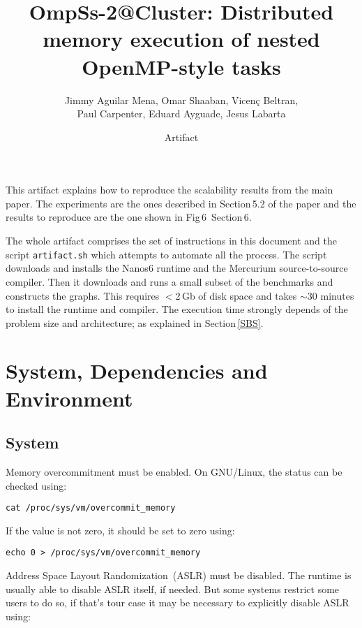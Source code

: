 \documentclass{article}
\newcommand{\code}[1]{\texttt{#1}}
\begin{document}
\title{OmpSs-2@Cluster: Distributed memory execution of nested OpenMP-style tasks}

\author{Jimmy Aguilar Mena, Omar Shaaban, Vicen\c{c} Beltran,\\
  Paul Carpenter, Eduard Ayguade, Jesus Labarta}
\date{Artifact}

\maketitle

This artifact explains how to reproduce the scalability results from
the main paper.  The experiments are the ones described in
Section\,5.2 of the paper and the results to reproduce are the one
shown in Fig\,6~Section\,6.

The whole artifact comprises the set of instructions in this document
and the script \code{artifact.sh} which attempts to automate all the
process.  The script downloads and installs the Nanos6 runtime and the
Mercurium source-to-source compiler.  Then it downloads and runs a
small subset of the benchmarks and constructs the graphs.  This
requires $<$2\,Gb of disk space and takes $\sim$30 minutes to install
the runtime and compiler.  The execution time strongly depends of the
problem size and architecture; as explained in Section\,\ref{SBS}.

\section{System, Dependencies and Environment}

\subsection{System}

Memory overcommitment must be enabled. On GNU/Linux, the status can be
checked using:

\begin{lstlisting}
cat /proc/sys/vm/overcommit_memory
\end{lstlisting}

If the value is not zero, it should be set to zero using:

\begin{lstlisting}
echo 0 > /proc/sys/vm/overcommit_memory
\end{lstlisting}

Address Space Layout Randomization~(ASLR) must be disabled.  The
runtime is usually able to disable ASLR itself, if needed. But some
systems restrict some users to do so, if that's tour case it may be
necessary to explicitly disable ASLR using:
\end{document}
